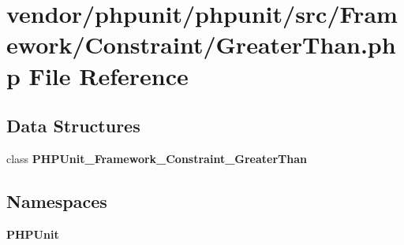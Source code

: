 \section{vendor/phpunit/phpunit/src/\+Framework/\+Constraint/\+Greater\+Than.php File Reference}
\label{_greater_than_8php}
\subsection*{Data Structures}
\begin{DoxyCompactItemize}
\item 
class {\bf P\+H\+P\+Unit\+\_\+\+Framework\+\_\+\+Constraint\+\_\+\+Greater\+Than}
\end{DoxyCompactItemize}
\subsection*{Namespaces}
\begin{DoxyCompactItemize}
\item 
 {\bf P\+H\+P\+Unit}
\end{DoxyCompactItemize}
